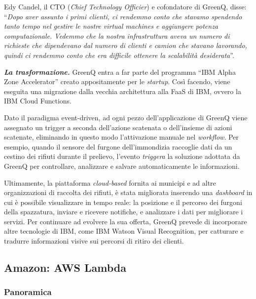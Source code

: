 \documentclass[a4paper]{article}
\newcommand{\dquotes}[1]{``#1''}
\begin{document}
	Edy Candel, il CTO (\emph{Chief Technology Officier}) e cofondatore di GreenQ, disse: \dquotes{\emph{Dopo aver assunto i primi clienti, ci rendemmo conto che stavamo spendendo tanto tempo nel gestire le nostre virtual machines e aggiungere potenza computazionale. Vedemmo che la nostra infrastruttura aveva un numero di richieste che dipendevano dal numero di clienti e camion che stavano lavorando, quindi ci rendemmo conto che era difficile ottenere la scalabilità desiderata}}.\newline
	
	\noindent
	\textbf{\emph{La trasformazione.}} GreenQ entra a far parte del programma \dquotes{IBM Alpha Zone Accelerator} creato appositamente per le \emph{startup}. Così facendo, viene eseguita una migrazione dalla vecchia architettura alla FaaS di IBM, ovvero la IBM Cloud Functions.
	
	Dato il paradigma event-driven, ad ogni pezzo dell'applicazione di GreenQ viene assegnato un trigger a seconda dell'azione scatenata o dell'insieme di azioni scatenate, eliminando in questo modo l'attivazione manuale nel \emph{workflow}. Per esempio, quando il sensore del furgone dell'immondizia raccoglie dati da un cestino dei rifiuti durante il prelievo, l'evento \emph{triggera} la soluzione adottata da GreenQ per controllare, analizzare e salvare automaticamente le informazioni.
	
	Ultimamente, la piattaforma \emph{cloud-based} fornita ai municipi e ad altre organizzazioni di raccolta dei rifiuti, è stata migliorata inserendo una \emph{dashboard} in cui è possibile visualizzare in tempo reale: la posizione e il percorso dei furgoni della spazzatura, inviare e ricevere notifiche, e analizzare i dati per migliorare i servizi. Per continuare ad evolvere la sua offerta, GreenQ prevede di incorporare altre tecnologie di IBM, come IBM Watson Visual Recognition, per catturare e tradurre informazioni visive sui percorsi di ritiro dei clienti.
	
	\subsection{Amazon: AWS Lambda}
	
	\subsubsection{Panoramica}
	
\end{document}
